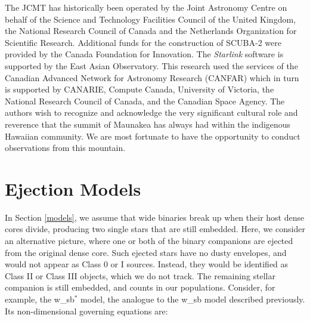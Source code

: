 \documentclass[usenatbib,a4paper]{mnras}
\begin{document}
The JCMT has historically been operated by the Joint Astronomy Centre on behalf of the Science and Technology Facilities Council of the United Kingdom, the National Research Council of Canada and the Netherlands Organization for Scientific Research. Additional funds for the construction of SCUBA-2 were provided by the Canada Foundation for Innovation.  The \emph{Starlink} software \citep{Currie14} is supported by the East Asian Observatory.  This research used the services of the Canadian Advanced Network for Astronomy Research (CANFAR) which in turn is supported by CANARIE, Compute Canada, University of Victoria, the National Research Council of Canada, and the Canadian Space Agency.  The authors wish to recognize and acknowledge the very significant cultural role and reverence that the summit of Maunakea has always had within the indigenous Hawaiian community. We are most fortunate to have the opportunity to conduct observations from this mountain. 




\renewcommand\thefigure{\thesection.\arabic{table}}
\setcounter{table}{0}

\appendix

\section{Ejection Models} \label{appendixA}

In Section \ref{models}, we assume that wide binaries break up when their host dense cores divide, producing two single stars that are still embedded.  Here, we consider an alternative picture, where one or both of the binary companions are ejected from the original dense core.  Such ejected stars have no dusty envelopes, and would not appear as Class 0 or I sources.  Instead, they would be identified as Class II or Class III objects, which we do not track.  The remaining stellar companion is still embedded, and counts in our populations.  Consider, for example, the w\_sb$^{\ast}$ model, the analogue to the w\_sb model described previously.  Its non-dimensional governing equations are:
\end{document}
